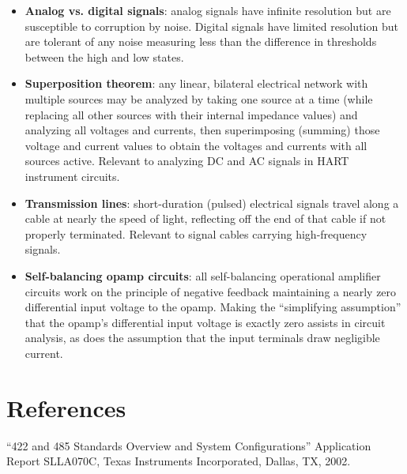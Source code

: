 \begin{itemize}
\item \textbf{Analog vs. digital signals}: analog signals have infinite resolution but are susceptible to corruption by noise.  Digital signals have limited resolution but are tolerant of any noise measuring less than the difference in thresholds between the high and low states.
\item \textbf{Superposition theorem}: any linear, bilateral electrical network with multiple sources may be analyzed by taking one source at a time (while replacing all other sources with their internal impedance values) and analyzing all voltages and currents, then superimposing (summing) those voltage and current values to obtain the voltages and currents with all sources active.  Relevant to analyzing DC and AC signals in HART instrument circuits.
\item \textbf{Transmission lines}: short-duration (pulsed) electrical signals travel along a cable at nearly the speed of light, reflecting off the end of that cable if not properly terminated.  Relevant to signal cables carrying high-frequency signals.
\item \textbf{Self-balancing opamp circuits}: all self-balancing operational amplifier circuits work on the principle of negative feedback maintaining a nearly zero differential input voltage to the opamp.  Making the ``simplifying assumption'' that the opamp's differential input voltage is exactly zero assists in circuit analysis, as does the assumption that the input terminals draw negligible current.
\end{itemize}









\filbreak
\section*{References}


\noindent
``422 and 485 Standards Overview and System Configurations'' Application Report SLLA070C, Texas Instruments Incorporated, Dallas, TX, 2002. 

\vskip 10pt

